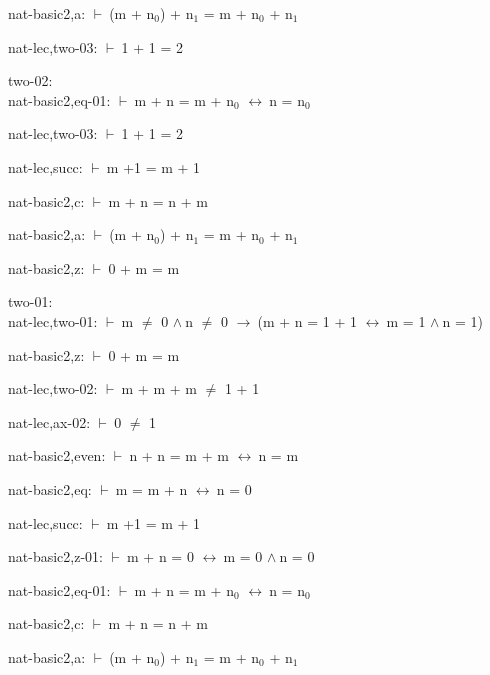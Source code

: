 \documentclass[a4paper]{article}
\newcommand{\Fol}{\mbox{$\vdash\ $}}
\newcommand{\And}{\mbox{$\wedge\ $}}
\newcommand{\Imp}{\mbox{$\rightarrow\ $}}
\newcommand{\Equiv}{\mbox{$\leftrightarrow\ $}}
\begin{document}
nat-basic2,a: 
 \Fol (m + $\mbox{n}_{0}$) + $\mbox{n}_{1}$ = m + $\mbox{n}_{0}$ + $\mbox{n}_{1}$



nat-lec,two-03: 
 \Fol 1 + 1 = 2



\bigskip

two-02:\\ nat-basic2,eq-01: 
 \Fol m + n = m + $\mbox{n}_{0}$ \Equiv n = $\mbox{n}_{0}$



nat-lec,two-03: 
 \Fol 1 + 1 = 2



nat-lec,succ: 
 \Fol m +1 = m + 1



nat-basic2,c: 
 \Fol m + n = n + m



nat-basic2,a: 
 \Fol (m + $\mbox{n}_{0}$) + $\mbox{n}_{1}$ = m + $\mbox{n}_{0}$ + $\mbox{n}_{1}$



nat-basic2,z: 
 \Fol 0 + m = m



\bigskip

two-01:\\ nat-lec,two-01: 
 \Fol m $\neq$ 0 \And n $\neq$ 0 \Imp (m + n = 1 + 1 \Equiv m = 1 \And n = 1)

nat-basic2,z: 
 \Fol 0 + m = m



nat-lec,two-02: 
 \Fol m + m + m $\neq$ 1 + 1



nat-lec,ax-02: 
 \Fol 0 $\neq$ 1



nat-basic2,even: 
 \Fol n + n = m + m \Equiv n = m



nat-basic2,eq: 
 \Fol m = m + n \Equiv n = 0



nat-lec,succ: 
 \Fol m +1 = m + 1



nat-basic2,z-01: 
 \Fol m + n = 0 \Equiv m = 0 \And n = 0



nat-basic2,eq-01: 
 \Fol m + n = m + $\mbox{n}_{0}$ \Equiv n = $\mbox{n}_{0}$



nat-basic2,c: 
 \Fol m + n = n + m



nat-basic2,a: 
 \Fol (m + $\mbox{n}_{0}$) + $\mbox{n}_{1}$ = m + $\mbox{n}_{0}$ + $\mbox{n}_{1}$
\end{document}
